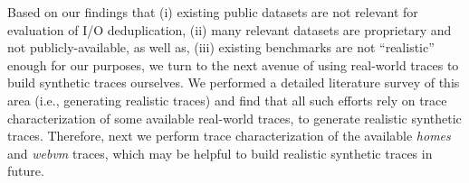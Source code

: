 Based on our findings that (i) existing public datasets are not
relevant for evaluation of I/O deduplication, (ii) many relevant
datasets are proprietary and not publicly-available, as well as,
(iii) existing benchmarks are not ``realistic'' enough for our purposes, 
we turn to the next avenue of using real-world traces to build
synthetic traces ourselves. We performed a detailed literature
survey of this area (i.e., generating realistic traces) and
find that all such efforts rely on trace characterization of some 
available real-world traces, to generate realistic synthetic traces. 
Therefore, next we perform trace characterization of the 
available \textit{homes} and \textit{webvm} traces,
which may be helpful to build realistic synthetic traces in future.
